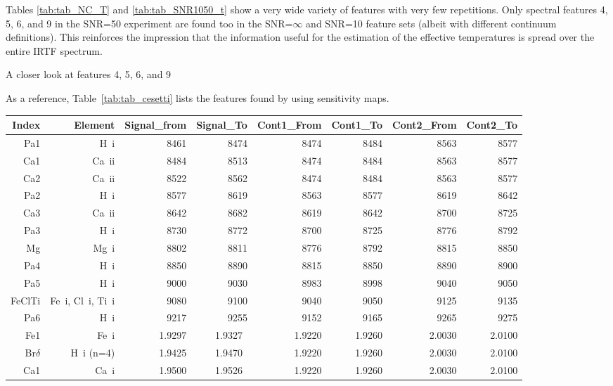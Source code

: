Tables \ref{tab:tab_NC_T} and \ref{tab:tab_SNR1050_t} show a very wide
variety of features with very few repetitions. Only spectral features
4, 5, 6, and 9 in the SNR=50 experiment are found too in the
SNR=$\infty$ and SNR=10 feature sets (albeit with different continuum
definitions). This reinforces the impression that the information
useful for the estimation of the effective temperatures is spread over
the entire IRTF spectrum.

A closer look at features 4, 5, 6, and 9 

As a reference, Table~\ref{tab:tab_cesetti} lists the features found
by \cite{2013A&A...549A.129C} using sensitivity maps. 

\begin{table}
\begin{center}
\begin{tabular}{rrrrrrrr}
  \hline
Index & Element & Signal\_from & Signal\_To & Cont1\_From & Cont1\_To & Cont2\_From & Cont2\_To \\ 
  \hline
  Pa1 & H~{\sc i}   & 8461 & 8474 & 8474 & 8484 & 8563 & 8577 \\ 
  Ca1 & Ca~{\sc ii} & 8484 & 8513 & 8474 & 8484 & 8563 & 8577 \\ 
  Ca2 & Ca~{\sc ii} & 8522 & 8562  & 8474 & 8484 & 8563 & 8577 \\ 
  Pa2 & H~{\sc i}   & 8577 & 8619 & 8563 & 8577 & 8619 & 8642 \\ 
  Ca3 & Ca~{\sc ii} & 8642 & 8682 & 8619 & 8642 & 8700 & 8725 \\ 
  Pa3 & H~{\sc i}   & 8730 & 8772 & 8700 & 8725 & 8776 & 8792 \\ 
  Mg  & Mg~{\sc i}  & 8802 & 8811 & 8776 & 8792 & 8815 & 8850 \\ 
  Pa4 & H~{\sc i}   & 8850 & 8890 & 8815 & 8850 & 8890 & 8900 \\ 
  Pa5 & H~{\sc i}   & 9000 & 9030 & 8983 & 8998 & 9040 & 9050 \\
  FeClTi & Fe~{\sc i}, Cl~{\sc i}, Ti~{\sc i} &9080 & 9100 & 9040 & 9050 & 9125 & 9135 \\
  Pa6 & H~{\sc i}   &9217 & 9255 & 9152 & 9165 & 9265 & 9275 \\
Fe1         & Fe{~\sc i}     & 1.9297 & 1.9327~& 1.9220 & 1.9260 & 2.0030 & 2.0100 \\
Br$\delta$  & H{~\sc i} (n=4)& 1.9425 & 1.9470~& 1.9220 & 1.9260 & 2.0030 & 2.0100 \\
Ca1         & Ca{~\sc i}     & 1.9500 & 1.9526~& 1.9220 & 1.9260 & 2.0030 & 2.0100 \\

\end{tabular}
\end{center}
\end{table}
